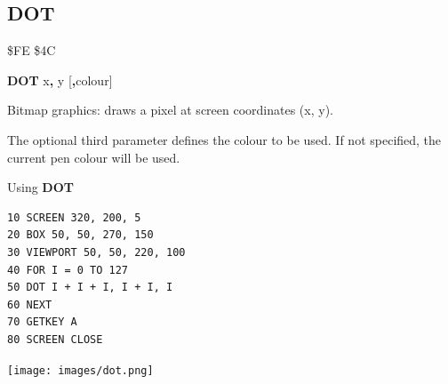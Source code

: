 
\newpage
\subsection{DOT}
\begin{description}[leftmargin=2cm,style=nextline]
\item [Token:]    \$FE \$4C
\item [Format:]   {\bf DOT} x{\bf,} y [{\bf,}colour]
\item [Usage:]    Bitmap graphics: draws a pixel at screen coordinates (x, y).

                  The optional third parameter defines the colour to be used. If not specified, the current pen colour will be used.

\item [Example:]  Using {\bf DOT}

\begin{tcolorbox}[colback=black,coltext=white]
\verbatimfont{\codefont}
\begin{verbatim}
10 SCREEN 320, 200, 5
20 BOX 50, 50, 270, 150
30 VIEWPORT 50, 50, 220, 100
40 FOR I = 0 TO 127
50 DOT I + I + I, I + I, I
60 NEXT
70 GETKEY A
80 SCREEN CLOSE
\end{verbatim}
\end{tcolorbox}

\item \begin{center}\texttt{[image: images/dot.png]}\end{center}
\end{description}


\newpage
